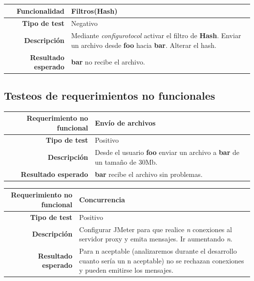 \documentclass[a4paper,10pt]{article}
\begin{document}
\begin{center}
  \begin{tabular}{|r|p{12.5cm}|}
    \hline
    \textbf{Funcionalidad}	&	Filtros(Hash)\\
    \hline
    \textbf{Tipo de test}	&	Negativo\\
    \hline
    \textbf{Descripción}	&	Mediante \textit{configurotocol} activar el filtro de \textbf{Hash}. 
					Enviar un archivo desde \textbf{foo} hacia \textbf{bar}. Alterar el hash.\\
    \hline
    \textbf{Resultado esperado}	&	\textbf{bar} no recibe el archivo.\\
    \hline   
  \end{tabular}
\end{center}

\subsection{Testeos de requerimientos no funcionales}

\begin{center}
  \begin{tabular}{|r|p{12.5cm}|}
    \hline
    \textbf{Requerimiento no funcional}	& Envío de archivos\\
    \hline
    \textbf{Tipo de test}	&	Positivo\\
    \hline
    \textbf{Descripción}	&	Desde el usuario \textbf{foo} enviar un archivo a \textbf{bar} de un tamaño de 30Mb.\\
    \hline
    \textbf{Resultado esperado}	&	\textbf{bar} recibe el archivo sin problemas.\\
    \hline   
  \end{tabular}
\end{center}

\begin{center}
  \begin{tabular}{|r|p{12.5cm}|}
    \hline
    \textbf{Requerimiento no funcional}	& Concurrencia\\
    \hline
    \textbf{Tipo de test}	&	Positivo\\
    \hline
    \textbf{Descripción}	&	Configurar JMeter para que realice \textit{n} conexiones al servidor proxy y emita mensajes.
					Ir aumentando \textit{n}.\\
    \hline
    \textbf{Resultado esperado}	&	Para n aceptable (analizaremos durante el desarrollo cuanto sería un n aceptable) no se rechazan conexiones y pueden emitirse los mensajes.\\
    \hline   
  \end{tabular}
\end{center}
\end{document}
